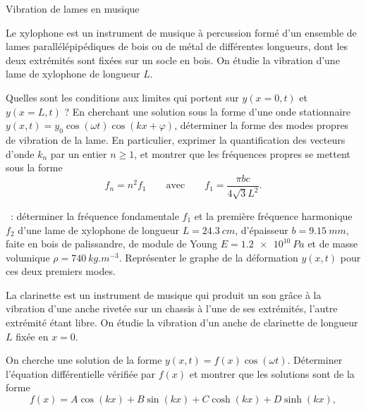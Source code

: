 \begin{exo}[PC][3][exp]{Vibration de lames en musique}
\begin{quest}
  \end{quest}
  Le xylophone est un instrument de musique à percussion formé d’un ensemble de lames parallélépipédiques de bois ou de métal de différentes longueurs, dont les deux extrémités sont fixées sur un socle en bois. On étudie la vibration d’une lame de xylophone de longueur $L$. 
  \begin{quest}
    \item	Quelles sont les conditions aux limites qui portent sur $y(x=0,t)$ et $y(x=L,t)$ ? En cherchant une solution sous la forme d’une onde stationnaire $y(x,t) = y_0 \cos(\omega t) \cos(k x + \varphi)$, déterminer la forme des modes propres de vibration de la lame. En particulier, exprimer la quantification des vecteurs d’onde $k_n$ par un entier $n\geq1$, et montrer que les fréquences propres se mettent sous la forme
    $$
    f_n = n^2 f_1 \qquad \text{avec} \qquad f_1 = \frac{\pi bc}{4\sqrt{3}L^2}.
    $$
    \item \AN~: déterminer la fréquence fondamentale $f_1$ et la première fréquence harmonique $f_2$ d'une lame de xylophone de longueur $L = \SI{24.3}{cm}$, d’épaisseur $b= \SI{9.15}{mm}$, faite en bois de palissandre, de module de Young $E = \SI{1.2e10}{Pa}$ et de masse volumique $\rho = \SI{740}{kg.m^{-3}}$. Représenter le graphe de la déformation $y(x,t)$ pour ces deux premiers modes.
  \end{quest}
  La clarinette est un instrument de musique qui produit un son grâce à la vibration d’une anche rivetée sur un chassis à l’une de ses extrémités, l’autre extrémité étant libre. On étudie la vibration d’un anche de clarinette de longueur $L$ fixée en $x=0$.
  \begin{quest}
    \item On cherche une solution de la forme $y(x,t) = f(x)\cos(\omega t)$. 
     Déterminer l’équation différentielle vérifiée par $f(x)$ et montrer que les solutions sont de la forme 
     $$
    f(x) = A \cos(kx) + B \sin(kx) + C \cosh(kx) + D \sinh(kx),
$$
\end{quest}
\end{exo}
